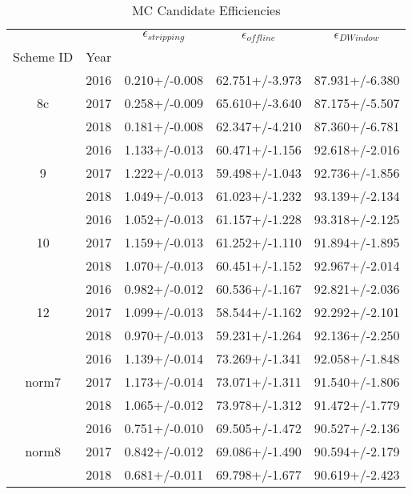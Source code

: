\begin{table}
\centering
\caption{MC Candidate Efficiencies}
\label{tab:can_offdwin_2}
\begin{tabular}{ccccc}
\toprule
      &      & $\epsilon_{stripping}$ & $\epsilon_{offline}$ & $\epsilon_{D Window}$ \\
Scheme ID & Year &                        &                      &                       \\
\midrule
\multirow{3}{*}{8c} & 2016 &          0.210+/-0.008 &       62.751+/-3.973 &        87.931+/-6.380 \\
      & 2017 &          0.258+/-0.009 &       65.610+/-3.640 &        87.175+/-5.507 \\
      & 2018 &          0.181+/-0.008 &       62.347+/-4.210 &        87.360+/-6.781 \\
\cline{1-5}
\multirow{3}{*}{9} & 2016 &          1.133+/-0.013 &       60.471+/-1.156 &        92.618+/-2.016 \\
      & 2017 &          1.222+/-0.013 &       59.498+/-1.043 &        92.736+/-1.856 \\
      & 2018 &          1.049+/-0.013 &       61.023+/-1.232 &        93.139+/-2.134 \\
\cline{1-5}
\multirow{3}{*}{10} & 2016 &          1.052+/-0.013 &       61.157+/-1.228 &        93.318+/-2.125 \\
      & 2017 &          1.159+/-0.013 &       61.252+/-1.110 &        91.894+/-1.895 \\
      & 2018 &          1.070+/-0.013 &       60.451+/-1.152 &        92.967+/-2.014 \\
\cline{1-5}
\multirow{3}{*}{12} & 2016 &          0.982+/-0.012 &       60.536+/-1.167 &        92.821+/-2.036 \\
      & 2017 &          1.099+/-0.013 &       58.544+/-1.162 &        92.292+/-2.101 \\
      & 2018 &          0.970+/-0.013 &       59.231+/-1.264 &        92.136+/-2.250 \\
\cline{1-5}
\multirow{3}{*}{norm7} & 2016 &          1.139+/-0.014 &       73.269+/-1.341 &        92.058+/-1.848 \\
      & 2017 &          1.173+/-0.014 &       73.071+/-1.311 &        91.540+/-1.806 \\
      & 2018 &          1.065+/-0.012 &       73.978+/-1.312 &        91.472+/-1.779 \\
\cline{1-5}
\multirow{3}{*}{norm8} & 2016 &          0.751+/-0.010 &       69.505+/-1.472 &        90.527+/-2.136 \\
      & 2017 &          0.842+/-0.012 &       69.086+/-1.490 &        90.594+/-2.179 \\
      & 2018 &          0.681+/-0.011 &       69.798+/-1.677 &        90.619+/-2.423 \\
\bottomrule
\end{tabular}
\end{table}
